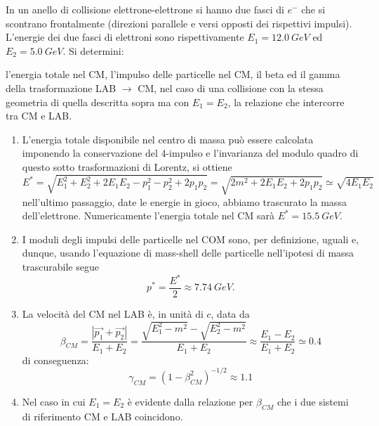 \begin{Exercise}[title={Cinematica ad un collider}]
In un anello di collisione elettrone-elettrone si hanno due fasci 
di $e^-$ che si scontrano frontalmente (direzioni parallele e versi opposti 
dei rispettivi impulsi). L'energie
dei due fasci di elettroni sono rispettivamente $E_1 = \SI{12.0}{GeV}$ ed
$E_2 = \SI{5.0}{GeV}$. Si determini: 

\Question l'energia totale nel CM, 
\Question l'impulso delle particelle nel CM, 
\Question il beta ed il gamma della trasformazione LAB $\to$ CM,
\Question nel caso di una collisione con la stessa geometria di quella descritta
sopra ma con $E_1=E_2$, la relazione che intercorre tra CM e LAB.
\end{Exercise}
\begin{Answer}
  \begin{enumerate}
  \item  L'energia totale disponibile nel centro di massa pu\`o essere 
    calcolata imponendo la conservazione del 4-impulso e l'invarianza 
    del modulo quadro di questo sotto trasformazioni di Lorentz, si ottiene
    \[
    E^*=\sqrt{E_1^2+E_2^2+2E_1 E_2-p_1^2 - p_2^2 +2 p_1 p_2}=
    \sqrt{2m^2+2 E_1 E_2 +2 p_1 p_2}\simeq \sqrt{4 E_1 E_2}
    \]
    nell'ultimo passaggio, date le energie in gioco, abbiamo trascurato 
    la massa dell'elettrone. Numericamente l'energia totale nel CM sar\`a
    $E^*=\SI{15.5}{GeV}$. 
    
  \item I moduli degli impulsi delle particelle nel COM sono, per definizione,
    uguali e, dunque, usando l'equazione di mass-shell delle particelle
    nell'ipotesi di massa trascurabile segue 
    \[
    p^*=\frac{E^*}{2} \approx \SI{7.74}{GeV}.
    \]

  \item       La velocit\`a del CM nel LAB \`e, in unit\`a di $c$, data da
    \[
    \beta_{CM}=\frac{|\vec{p_1}+\vec{p_2}|}{E_1+E_2}=
    \frac{\sqrt{E_1^2-m^2} - \sqrt{E_2^2-m^2}}{E_1+E_2} \approx 
    \frac{E_1-E_2}{E_1+E_2} \simeq 0.4
    \]
    di conseguenza:
    \[
    \gamma_{CM}=(1-\beta_{CM}^2)^{-1/2} \approx 1.1
    \]

    \item Nel caso in cui $E_1=E_2$ \`e evidente dalla relazione per $\beta_{CM}$ 
      che i due sistemi di riferimento CM e LAB coincidono.
  \end{enumerate}
\end{Answer}
